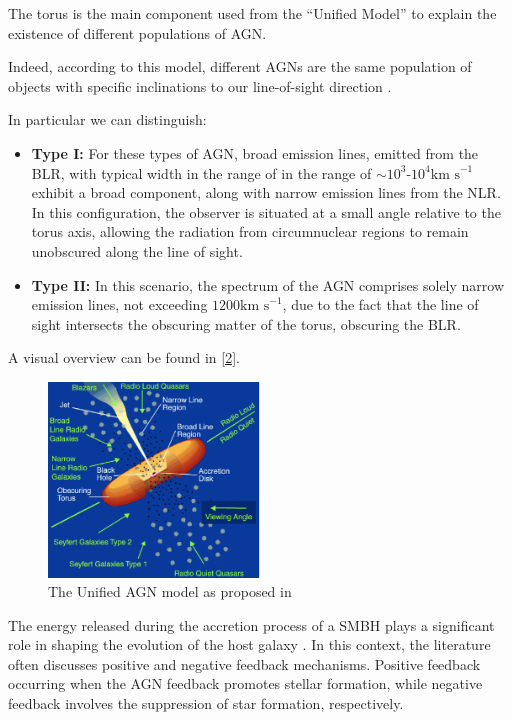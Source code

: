 The torus is the main component used from the “Unified Model” \cite{1995PASP..107..803U} to explain the existence of different populations of AGN. %
 
Indeed, according to this model, different AGNs are the same population of objects with specific inclinations to our line-of-sight direction \cite{1993ARA&A..31..473A}.

In particular we can distinguish:
 
\begin{itemize}
  \item \textbf{Type I:} For these types of AGN, broad emission lines, emitted from the BLR, with typical width in the range of in the range of $\sim 10^{3}$-$10^{4} \text{km s}^{-1}$ exhibit a broad component,  along with narrow emission lines from the NLR. In this configuration, the observer is situated at a small angle relative to the torus axis, allowing the radiation from circumnuclear regions to remain unobscured along the line of sight.
  
  \item \textbf{Type II:} In this scenario, the spectrum of the AGN comprises solely narrow emission lines, not exceeding $1200  \text{km s}^{-1}$, due to the fact that the line of sight intersects the obscuring matter of the torus, obscuring the BLR.
  
\end{itemize}
A visual overview can be found in \autoref{2}.



\begin{figure}[hbtb]
  \centering
  \includegraphics[width=0.5\textwidth]{UnifiedAGNmodel}
  \caption{The Unified AGN model as proposed in \cite{1995PASP..107..803U}}
  \label{2}
\end{figure}



The energy released during the accretion process of a SMBH plays a significant role in shaping the evolution of the host galaxy \cite{2021A&A...646A.167M}. In this context, the literature often discusses positive and negative feedback mechanisms.
Positive feedback occurring when the AGN feedback promotes stellar formation, while negative feedback involves the suppression of star formation, respectively. %

